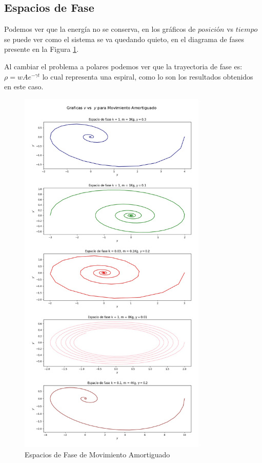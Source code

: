 \documentclass[a4paper]{article}
\begin{document}
\subsection{Espacios de Fase}

Podemos ver que la energía no se conserva, en los gráficos de $posición$ vs $tiempo$ se puede ver como el sistema se va quedando quieto, en el diagrama de fases presente en la Figura \ref{fig:Figura4}.

Al cambiar el problema a polares podemos ver que la trayectoria de fase es:  $\rho=wAe^{-\gamma t}$ lo cual representa una espiral, como lo son los resultados obtenidos en este caso.

\begin{figure}
\centering
\includegraphics[width=0.8\textwidth]{Amortiguado_fases.jpg}
\caption{Espacios de Fase de Movimiento Amortiguado}
\label{fig:Figura4}
\end{figure}
\end{document}
